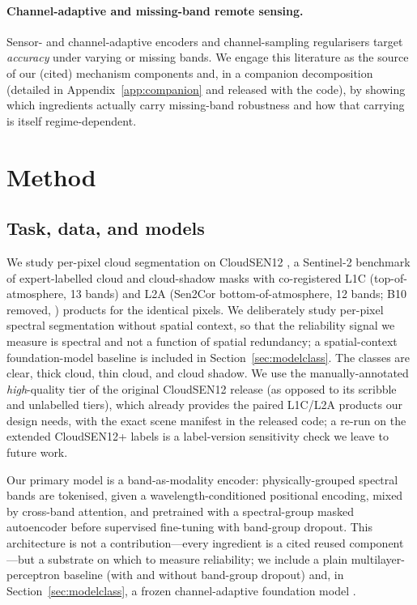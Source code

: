 \documentclass[preprint,3p,times]{elsarticle}
\begin{document}
\paragraph{Channel-adaptive and missing-band remote sensing.} Sensor- and channel-adaptive encoders \citep{xiong2024dofa,waldmann2025panopticon,francis2021sensei} and channel-sampling regularisers \citep{bao2024channelvit,pham2024dichavit} target \emph{accuracy} under varying or missing bands. We engage this literature as the source of our (cited) mechanism components and, in a companion decomposition (detailed in Appendix~\ref{app:companion} and released with the code), by showing which ingredients actually carry missing-band robustness and how that carrying is itself regime-dependent.

\section{Method}
\label{sec:method}
\subsection{Task, data, and models}
We study per-pixel cloud segmentation on CloudSEN12 \citep{aybar2022cloudsen12}, a Sentinel-2 benchmark of expert-labelled cloud and cloud-shadow masks with co-registered L1C (top-of-atmosphere, 13 bands) and L2A (Sen2Cor bottom-of-atmosphere, 12 bands; B10 removed, \citealt{mainknorn2017sen2cor}) products for the identical pixels. We deliberately study per-pixel spectral segmentation without spatial context, so that the reliability signal we measure is spectral and not a function of spatial redundancy; a spatial-context foundation-model baseline is included in Section~\ref{sec:modelclass}. The classes are clear, thick cloud, thin cloud, and cloud shadow. We use the manually-annotated \emph{high}-quality tier of the original CloudSEN12 release (as opposed to its scribble and unlabelled tiers), which already provides the paired L1C/L2A products our design needs, with the exact scene manifest in the released code; a re-run on the extended CloudSEN12+ labels is a label-version sensitivity check we leave to future work.

Our primary model is a band-as-modality encoder: physically-grouped spectral bands are tokenised, given a wavelength-conditioned positional encoding, mixed by cross-band attention, and pretrained with a spectral-group masked autoencoder before supervised fine-tuning with band-group dropout. This architecture is not a contribution---every ingredient is a cited reused component---but a substrate on which to measure reliability; we include a plain multilayer-perceptron baseline (with and without band-group dropout) and, in Section~\ref{sec:modelclass}, a frozen channel-adaptive foundation model \citep[DOFA,][]{xiong2024dofa}.
\end{document}

